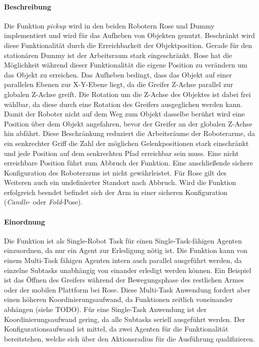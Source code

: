 \paragraph{Beschreibung}
Die Funktion \textit{pickup} wird in den beiden Robotern Rose und Dummy implementiert und wird für das Aufheben von Objekten genutzt. Beschränkt wird diese Funktionalität durch die Erreichbarkeit der Objektposition. Gerade für den stationären Dummy ist der Arbeitsraum stark eingeschränkt. Rose hat die Möglichkeit während dieser Funktionalität die eigene Position zu verändern um das Objekt zu erreichen. Das Aufheben bedingt, dass das Objekt auf einer parallelen Ebenen zur X-Y-Ebene liegt, da die Greifer Z-Achse parallel zur globalen Z-Achse greift. Die Rotation um die Z-Achse des Objektes ist dabei frei wählbar, da diese durch eine Rotation des Greifers ausgeglichen werden kann. Damit der Roboter nicht auf dem Weg zum Objekt dasselbe berührt wird eine Position über dem Objekt angefahren, bevor der Greifer an der globalen Z-Achse hin abfährt.  Diese Beschränkung reduziert die Arbeitsräume der Roboterarme, da ein senkrechter Griff die Zahl der möglichen Gelenkpositionen stark einschränkt und jede Position auf dem senkrechten Pfad erreichbar sein muss. Eine nicht erreichbare Position führt zum Abbruch der Funktion. Eine anschließende sichere Konfiguration des Roboterarms ist nicht gewährleistet. Für Rose gilt des Weiteren auch ein undefinierter Standort nach Abbruch. Wird die Funktion erfolgreich beendet befindet sich der Arm in einer sicheren Konfiguration (\textit{Candle}- oder \textit{Fold}-Pose).

\paragraph{Einordnung}
Die Funktion ist als Single-Robot Task für einen Single-Task-fähigen Agenten einzuordnen, da nur ein Agent zur Erledigung nötig ist. Die Funktion kann von einem Multi-Task fähigen Agenten intern auch parallel ausgeführt werden, da einzelne Subtasks unabhängig von einander erledigt werden können. Ein Beispiel ist das Öffnen des Greifers während der Bewegungsphase des restlichen Armes oder der mobilen Plattform bei Rose. Diese Multi-Task Anwendung fordert aber einen höheren Koordinierungsaufwand, da Funktionen zeitlich voneinander abhängen (siehe TODO). Für eine Single-Task Anwendung ist der Koordinierungsaufwand gering, da alle Subtasks seriell ausgeführt werden. Der Konfigurationsaufwand ist mittel, da zwei Agenten für die Funktionalität bereitstehen, welche sich über den Aktionsradius für die Ausführung qualifizieren. 

